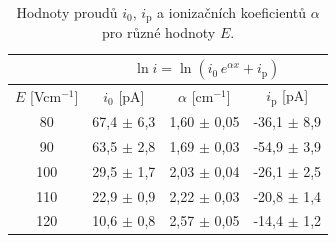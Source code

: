\documentclass[a4paper,12pt]{article}
\newcommand{\e}{\text{e}}
\begin{document}
\begin{center}
	\begin{table}[h]
		\centering
		\caption{Hodnoty proudů $i_0$, $i_\text{p}$ a ionizačních koeficientů $\alpha$ pro různé hodnoty $E$.}
		\label{tabiposun}
		\begin{tabular}{|c|c|c|c|} \hline
			\multicolumn{1}{|c|}{}  & \multicolumn{3}{c|}{$\ln i =\ln (i_0\,e^{\alpha x} + i_\text{p})$}\\ \hline
			$E$ [Vcm$^{-1}$] & $i_0$ [pA] & $\alpha$ [cm$^{-1}$] &  $i_\text{p}$ [pA]\\ \hline
			80 & 67,4 $\pm$ 6,3 & 1,60 $\pm$ 0,05 & -36,1 $\pm$ 8,9\\ \hline
			90 & 63,5 $\pm$ 2,8 & 1,69 $\pm$ 0,03 & -54,9 $\pm$ 3,9\\ \hline
			100 & 29,5 $\pm$ 1,7 & 2,03 $\pm$ 0,04 & -26,1 $\pm$ 2,5\\ \hline
			110 & 22,9 $\pm$ 0,9 & 2,22 $\pm$ 0,03 & -20,8 $\pm$ 1,4\\ \hline
			120 & 10,6 $\pm$ 0,8 & 2,57 $\pm$ 0,05 & -14,4 $\pm$ 1,2\\ \hline
			
		\end{tabular}
	\end{table}
\end{center}


%			
\end{document}
